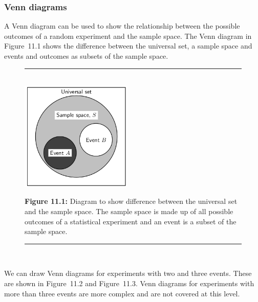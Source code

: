             \subsubsection{ Venn diagrams}
            \nopagebreak
            \label{m39377*id110213}A Venn diagram can be used to show
the relationship between the possible outcomes of a random experiment and the
sample space. The Venn diagram in Figure~11.1 shows the difference
between the universal set, a sample space and events and outcomes as subsets of
the sample space.\par 
    \setcounter{subfigure}{0}
	\begin{figure}[H] %
    \begin{center}
    \rule[.1in]{\figurerulewidth}{.005in} \\
        \label{m39377*uid12!!!underscore!!!media}\label{m39377*uid12!!!underscore!!!printimage}\includegraphics[width=200px]{col11306.imgs/m39377_MG10C17_001.png} %
      \vspace{2pt}
    \vspace{\rubberspace}\par \begin{cnxcaption}
	  \small \textbf{Figure 11.1: }Diagram to show difference between the universal set and
the sample space. The sample space is made up of all possible outcomes of a
statistical experiment and an event is a subset of the sample space.
	\end{cnxcaption}
    \vspace{.1in}
    \rule[.1in]{\figurerulewidth}{.005in} \\
    \end{center}
 \end{figure}       
          \label{m39377*eip-451}We can draw Venn diagrams for experiments with two and three events. These are shown in Figure~11.2 and Figure~11.3. Venn diagrams for experiments with more than three events are more complex and are not covered at this level. \par 
